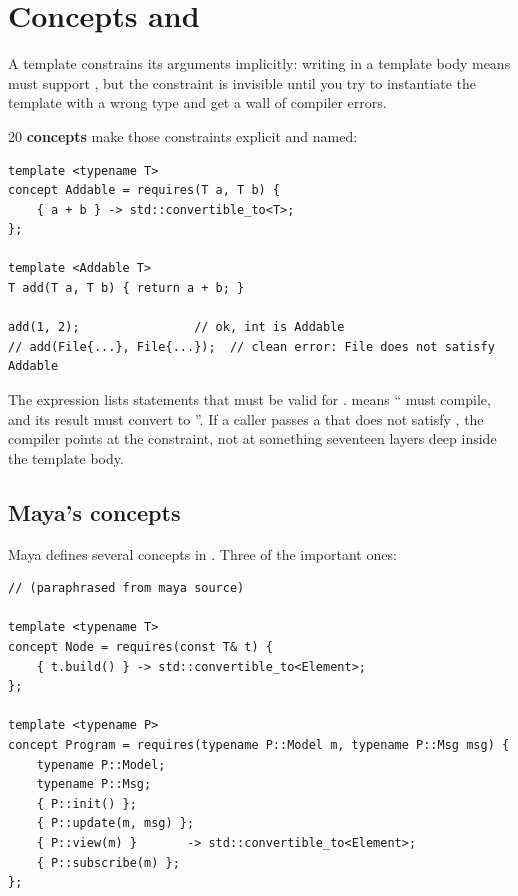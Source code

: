 \section{Concepts and }
\label{sec:cpp:concepts}

A template constrains its arguments implicitly: writing 
in a template body means  must support , but
the constraint is invisible until you try to instantiate the
template with a wrong type and get a wall of compiler errors.

\cpp{}20 \textbf{concepts} make those constraints explicit and
named:

\begin{lstlisting}
template <typename T>
concept Addable = requires(T a, T b) {
    { a + b } -> std::convertible_to<T>;
};

template <Addable T>
T add(T a, T b) { return a + b; }

add(1, 2);                // ok, int is Addable
// add(File{...}, File{...});  // clean error: File does not satisfy Addable
\end{lstlisting}

The  expression lists statements that must be valid
for .  means
`` must compile, and its result must convert to
''. If a caller passes a  that does not satisfy
, the compiler points at the constraint, not at
something seventeen layers deep inside the template body.

\subsection{Maya's concepts}

Maya defines several concepts in . Three of
the important ones:

\begin{lstlisting}
// (paraphrased from maya source)

template <typename T>
concept Node = requires(const T& t) {
    { t.build() } -> std::convertible_to<Element>;
};

template <typename P>
concept Program = requires(typename P::Model m, typename P::Msg msg) {
    typename P::Model;
    typename P::Msg;
    { P::init() };
    { P::update(m, msg) };
    { P::view(m) }       -> std::convertible_to<Element>;
    { P::subscribe(m) };
};
\end{lstlisting}

